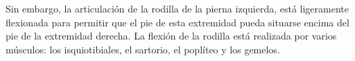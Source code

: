 Sin embargo, la articulación de la rodilla de la pierna izquierda, está ligeramente flexionada para permitir que el pie de esta extremidad pueda situarse encima del pie de la extremidad derecha. La flexión de la rodilla está realizada por varios músculos: los isquiotibiales, el sartorio, el poplíteo y los gemelos.
